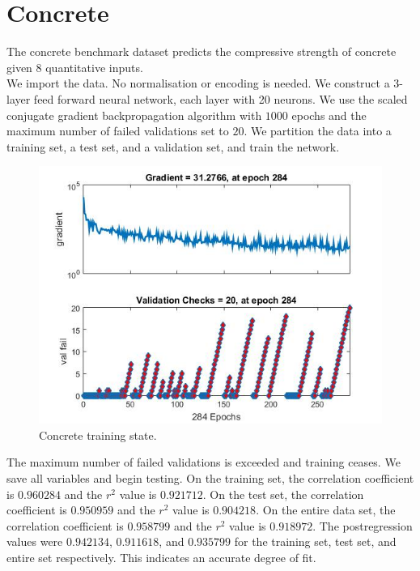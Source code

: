 \documentclass{article}%
\begin{document}
\section{Concrete}
The concrete benchmark dataset predicts the compressive strength of concrete given 8 quantitative inputs.
\\
We import the data. No normalisation or encoding is needed. We construct a 3-layer feed forward neural network, each layer with 20 neurons. We use the scaled conjugate gradient backpropagation algorithm with $1000$ epochs and the maximum number of failed validations set to $20$. We partition the data into a training set, a test set, and a validation set, and train the network.
\begin{figure}[H]
\centering
\includegraphics[scale=0.5]{Concrete/training.jpg}
\caption{Concrete training state.}
\label{fig:contrain}
\end{figure}
The maximum number of failed validations is exceeded and training ceases. We save all variables and begin testing. On the training set, the correlation coefficient is $0.960284$ and the $r^2$ value is $0.921712$. On the test set, the correlation coefficient is $0.950959$ and the $r^2$ value is $0.904218$. On the entire data set, the correlation coefficient is $0.958799$ and the $r^2$ value is $0.918972$. The postregression values were $0.942134$, $0.911618$, and $0.935799$ for the training set, test set, and entire set respectively. This indicates an accurate degree of fit. 
\end{document}
